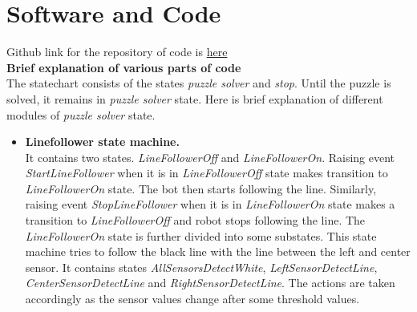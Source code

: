 \documentclass[a4paper,12pt,oneside]{book}
\begin{document}
\section{Software and Code}
Github link for the repository of code is \href{https://github.com/eYSIP-2017/Statechart-Based-Modeling-of-Robotic-Themes}{here}
\\
\textbf{Brief explanation of various parts of code }
\\
The statechart consists of the states \textit{puzzle solver} and \textit{stop}. Until the puzzle is solved, it remains in \textit{puzzle solver} state. Here is brief explanation of different modules of \textit{puzzle solver} state. 
\begin{itemize}
\item \textbf{Linefollower state machine.}\\ 
It contains two states. \textit{LineFollowerOff} and \textit{LineFollowerOn}. Raising event \textit{StartLineFollower} when it is in \textit{LineFollowerOff} state makes transition to \textit{LineFollowerOn} state. The bot then starts following the line. Similarly, raising event \textit{StopLineFollower} when it is in \textit{LineFollowerOn} state makes a transition to \textit{LineFollowerOff} and robot stops following the line.
The \textit{LineFollowerOn} state is further divided into some substates. This state machine tries to follow the black line with the line between the left and center sensor. It contains states \textit{AllSensorsDetectWhite}, \textit{LeftSensorDetectLine}, \textit{CenterSensorDetectLine} and \textit{RightSensorDetectLine}. The actions are taken accordingly as the sensor values change after some threshold values.
	\begin{figure}[h]
		\centering

\end{figure}
\end{itemize}
\end{document}
